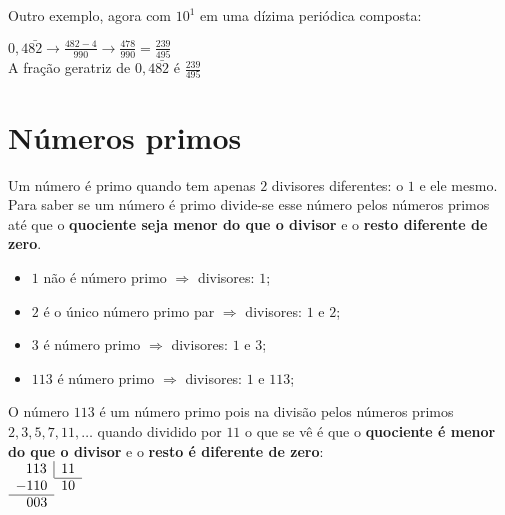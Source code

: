 Outro exemplo, agora com $ 10^1 $ em uma dízima periódica composta:

$ 0,4\bar{82} \longrightarrow \frac{482-4}{990} \longrightarrow \frac{478}{990} = \frac{239}{495} $\\
A fração geratriz de $ 0,4\bar{82} $ é $ \frac{239}{495} $

\section{Números primos}
Um número é primo quando tem apenas $2$ divisores diferentes: o $1$ e ele mesmo.\\
Para saber se um número é primo divide-se esse número pelos números primos até que o \textbf{quociente seja menor do que o divisor} e o \textbf{resto diferente de zero}.

\begin{itemize}
	\item $1$ não é número primo $\Rightarrow$ divisores: $1$;
	\item $2$ é o único número primo par $\Rightarrow$ divisores: $1$ e $2$;
	\item $3$ é número primo $\Rightarrow$ divisores: $1$ e $3$;
	\item $113$ é número primo $\Rightarrow$ divisores: $1$ e $113$;
\end{itemize}

O número $113$ é um número primo pois na divisão pelos números primos $2, 3, 5, 7, 11, \dots$ quando dividido por $11$ o que se vê é que o \textbf{quociente é menor do que o divisor} e o \textbf{resto é diferente de zero}:\\


	$
	\begin{array}{l l r r}
	\multicolumn{2}{r}{113} \vline & \multicolumn{2}{c}{11} \\ \cline{3-4}
	\multicolumn{2}{l}{-110} & \multicolumn{2}{l}{10} \\ \cline{1-2}
	\multicolumn{2}{r}{003} &  \\
	\end{array}
	$
	

